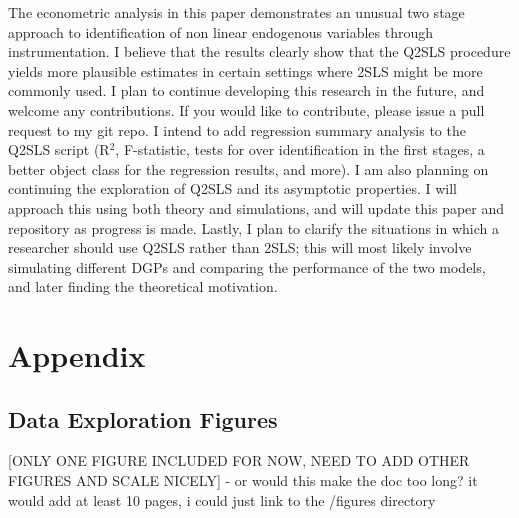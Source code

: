 \documentclass[12pt]{article}
\begin{document}
The econometric analysis in this paper demonstrates an unusual two stage approach to identification of non linear endogenous variables through instrumentation. I believe that the results clearly show that the Q2SLS procedure yields more plausible estimates in certain settings where 2SLS might be more commonly used. I plan to continue developing this research in the future, and welcome any contributions. If you would like to contribute, please issue a pull request to my git repo. I intend to add regression summary analysis to the Q2SLS script (R$^2$, F-statistic, tests for over identification in the first stages, a better object class for the regression results, and more). I am also planning on continuing the exploration of Q2SLS and its asymptotic properties. I will approach this using both theory and simulations, and will update this paper and repository as progress is made. Lastly, I plan to clarify the situations in which a researcher should use Q2SLS rather than 2SLS; this will most likely involve simulating different DGPs and comparing the performance of the two models, and later finding the theoretical motivation.

\newpage

\begin{singlespace}

\nocite{*} %

\end{singlespace}

\newpage
\section{Appendix}

\subsection{Data Exploration Figures} \label{appendix_figs}
\textcolor{BrickRed}{[ONLY ONE FIGURE INCLUDED FOR NOW, NEED TO ADD OTHER FIGURES AND SCALE NICELY] - or would this make the doc too long? it would add at least 10 pages, i could just link to the /figures directory}
\end{document}
